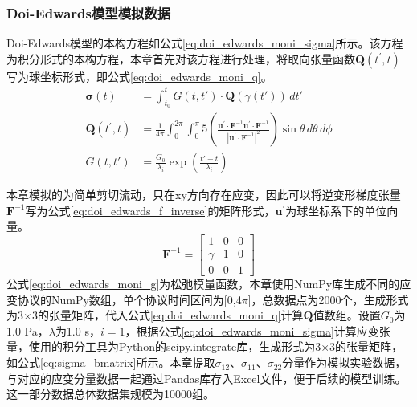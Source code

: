\subsubsection{Doi-Edwards模型模拟数据}
Doi-Edwards模型的本构方程如公式\eqref{eq:doi_edwards_moni_sigma}所示。该方程为积分形式的本构方程，本章首先对该方程进行处理，将取向张量函数$\mathbf{Q}(t^{\prime},t)$写为球坐标形式，即公式\eqref{eq:doi_edwards_moni_q}。
\begin{align}
  \boldsymbol{\sigma}(t)   & = \int_{t_0}^t G(t, t') \cdot \mathbf{Q}(\gamma(t')) \, dt' \label{eq:doi_edwards_moni_sigma}                                                                                                                                                                               \\
  \mathbf{Q}(t^{\prime},t) & = \frac{1}{4\pi} \int_{0}^{2\pi} \int_{0}^{\pi} 5 \left( \frac{\mathbf{u}^{\prime} \cdot \mathbf{F}^{-1} \mathbf{u}^{\prime} \cdot \mathbf{F}^{-1}}{|\mathbf{u}^{\prime} \cdot \mathbf{F}^{-1}|^{2}} \right) \sin\theta \, d\theta \, d\phi   \label{eq:doi_edwards_moni_q} \\
  G(t, t')                 & = \frac{G_0}{\lambda_i} \exp\left( \frac{t' - t}{\lambda_i} \right)   \label{eq:doi_edwards_moni_g}
\end{align}

本章模拟的为简单剪切流动，只在xy方向存在应变，因此可以将逆变形梯度张量$\mathbf{F}^{-1}$写为公式\eqref{eq:doi_edwards_f_inverse}的矩阵形式，$\mathbf{u}^{\prime}$为球坐标系下的单位向量。
\begin{equation}
  \mathbf{F}^{-1} = \begin{bmatrix}
    1      & 0 & 0 \\
    \gamma & 1 & 0 \\
    0      & 0 & 1
  \end{bmatrix} \label{eq:doi_edwards_f_inverse}
\end{equation}
公式\eqref{eq:doi_edwards_moni_g}为松弛模量函数，本章使用NumPy库生成不同的应变协议的NumPy数组，单个协议时间区间为[0,4$\pi$]，总数据点为2000个，生成形式为3$\times$3的张量矩阵，代入公式\eqref{eq:doi_edwards_moni_q}计算$\mathbf{Q}$值数组。设置$G_0$为1.0 Pa，$\lambda$为1.0 s，$i=1$，根据公式\eqref{eq:doi_edwards_moni_sigma}计算应变张量，使用的积分工具为Python的scipy.integrate库，生成形式为3$\times$3的张量矩阵，如公式\eqref{eq:sigma_bmatrix}所示。本章提取$\sigma_{12}$、$\sigma_{11}$、$\sigma_{22}$分量作为模拟实验数据，与对应的应变分量数据一起通过Pandas库存入Excel文件，便于后续的模型训练。这一部分数据总体数据集规模为10000组。


